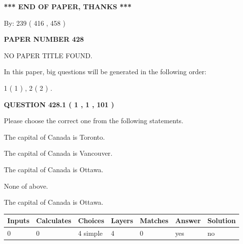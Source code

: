 \documentclass[12pt]{article}
\begin{document}
   
\vspace{1.0in} 
{\textbf{\large{ *** END OF PAPER, THANKS *** }}} 
   
   
\hspace{1.0in} By: 
 239 ( 416 ,  458 )
   
   
   
   
\newpage 
\setcounter{page}{ 
   428001 } 
   
   
   
   
 {\textbf{ \Large{ PAPER NUMBER  428  }}}
   
   
\vspace{0.2in}
   
   
   
   
   
   
 NO PAPER TITLE FOUND.
   
   
   
\vspace{0.2in}
   
In this paper, big questions will be generated in the following order: 
   
   
   1 ( 1 )
 ,
   2 ( 2 )
 .
  
\vspace{0.2in}
  
{\textbf{\Large{QUESTION
428.1 
 ( 1 , 1 , 101 )
}}}
  
  
Please choose the correct one from the following statements.
 
 
The capital of Canada is Toronto.
 
 
The capital of Canada is Vancouver.
 
 
The capital of Canada is Ottawa.
 
 
 None of above.
 
 
\noindent{}
 
 
The capital of Canada is Ottawa.
 
 
\noindent{}
 
 
   
   
   
   
\noindent\begin{tabular}{|l|l|l|l|l|l|l|}
 \hline
Inputs & Calculates & Choices & Layers & Matches & Answer & Solution \\ \hline
 0  & 
 0  & 
 4
  simple  
  & 
 4  & 
 0  & 
  yes & 
  no 
  \\ \hline
 \end{tabular}
   
\end{document}
